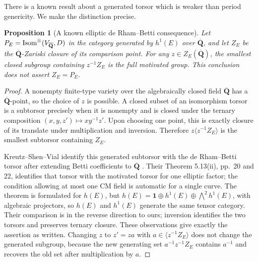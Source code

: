\documentclass[11pt]{article}
\newtheorem{proposition}[theorem]{Proposition}
\theoremstyle{definition}\newtheorem{definition}[theorem]{Definition}
\theoremstyle{remark}\newtheorem{remark}[theorem]{Remark}
\newcommand{\Qb}{\overline{\mathbf Q}}\newcommand{\Fp}{\mathbf F_p}
\begin{document}
There is a known result about a generated torsor which is weaker than period genericity. We make the distinction precise.
\begin{proposition}[A known elliptic de Rham--Betti consequence]\label{prop:generated-elliptic-torsor}
Let $P_E=\Isom^{\otimes}(V_{\Qb},D)$ in the category generated by $h^1(E)$ over $\Qb$, and let $Z_E$ be the $\Qb$-Zariski closure of its comparison point. For any $z\in Z_E(\Qb)$, the smallest closed subgroup containing $z^{-1}Z_E$ is the full motivated group. This conclusion does not assert $Z_E=P_E$.
\end{proposition}
\begin{proof}
A nonempty finite-type variety over the algebraically closed field $\Qb$ has a $\Qb$-point, so the choice of $z$ is possible. A closed subset of an isomorphism torsor is a subtorsor precisely when it is nonempty and is closed under the ternary composition $(x,y,z')\mapsto xy^{-1}z'$. Upon choosing one point, this is exactly closure of its translate under multiplication and inversion. Therefore $z\langle z^{-1}Z_E\rangle$ is the smallest subtorsor containing $Z_E$.

Kreutz--Shen--Vial identify this generated subtorsor with the de Rham--Betti torsor after extending Betti coefficients to $\Qb$ \cite[Proposition 3.1, p.~8]{KSV}. Their Theorem 5.13(ii), pp.~20 and 22, identifies that torsor with the motivated torsor for one elliptic factor; the condition allowing at most one CM field is automatic for a single curve. The theorem is formulated for $h(E)$, but
$h(E)=\mathbf1\oplus h^1(E)\oplus\bigwedge^2h^1(E)$, with algebraic projectors, so $h(E)$ and $h^1(E)$ generate the same tensor category. Their comparison is in the reverse direction to ours; inversion identifies the two torsors and preserves ternary closure. These observations give exactly the assertion as written. Changing $z$ to $z'=za$ with $a\in\langle z^{-1}Z_E\rangle$ does not change the generated subgroup, because the new generating set $a^{-1}z^{-1}Z_E$ contains $a^{-1}$ and recovers the old set after multiplication by $a$.
\end{proof}
\end{document}
